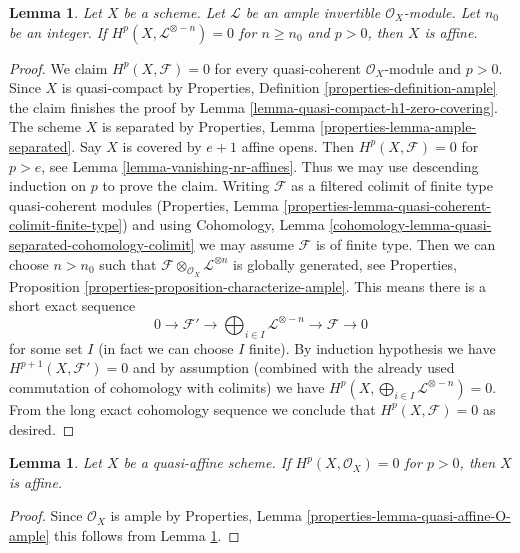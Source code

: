 \documentclass{stacks-project}
\theoremstyle{plain}
\newtheorem{lemma}[subsection]{Lemma}
\theoremstyle{definition}
\theoremstyle{remark}
\numberwithin{equation}{subsection}
\begin{document}
\begin{lemma}
\label{lemma-affine-in-presence-ample}
Let $X$ be a scheme. Let $\mathcal{L}$ be an ample invertible
$\mathcal{O}_X$-module. Let $n_0$ be an integer.
If $H^p(X, \mathcal{L}^{\otimes -n}) = 0$ for $n \geq n_0$ and $p > 0$,
then $X$ is affine.
\end{lemma}

\begin{proof}
We claim $H^p(X, \mathcal{F}) = 0$ for every quasi-coherent
$\mathcal{O}_X$-module and $p > 0$. Since $X$ is quasi-compact
by Properties, Definition \ref{properties-definition-ample}
the claim finishes the proof
by Lemma \ref{lemma-quasi-compact-h1-zero-covering}.
The scheme $X$ is separated by
Properties, Lemma \ref{properties-lemma-ample-separated}.
Say $X$ is covered by $e + 1$ affine opens. Then
$H^p(X, \mathcal{F}) = 0$ for $p > e$, see
Lemma \ref{lemma-vanishing-nr-affines}. Thus we may use descending
induction on $p$ to prove the claim. Writing $\mathcal{F}$
as a filtered colimit of finite type quasi-coherent
modules (Properties, Lemma
\ref{properties-lemma-quasi-coherent-colimit-finite-type})
and using Cohomology, Lemma
\ref{cohomology-lemma-quasi-separated-cohomology-colimit}
we may assume $\mathcal{F}$ is of finite type.
Then we can choose $n > n_0$ such that
$\mathcal{F} \otimes_{\mathcal{O}_X} \mathcal{L}^{\otimes n}$
is globally generated, see Properties, Proposition
\ref{properties-proposition-characterize-ample}.
This means there is a short exact sequence
$$
0 \to \mathcal{F}' \to
\bigoplus\nolimits_{i \in I} \mathcal{L}^{\otimes -n}
\to \mathcal{F} \to 0
$$
for some set $I$ (in fact we can choose $I$ finite). By
induction hypothesis we have $H^{p + 1}(X, \mathcal{F}') = 0$
and by assumption (combined with the already used
commutation of cohomology with colimits)
we have $H^p(X, \bigoplus_{i \in I} \mathcal{L}^{\otimes -n}) = 0$.
From the long exact cohomology sequence we conclude that
$H^p(X, \mathcal{F}) = 0$ as desired.
\end{proof}

\begin{lemma}
\label{lemma-affine-if-quasi-affine}
Let $X$ be a quasi-affine scheme.
If $H^p(X, \mathcal{O}_X) = 0$ for $p > 0$,
then $X$ is affine.
\end{lemma}

\begin{proof}
Since $\mathcal{O}_X$ is ample by
Properties, Lemma \ref{properties-lemma-quasi-affine-O-ample}
this follows from Lemma \ref{lemma-affine-in-presence-ample}.
\end{proof}
\end{document}
